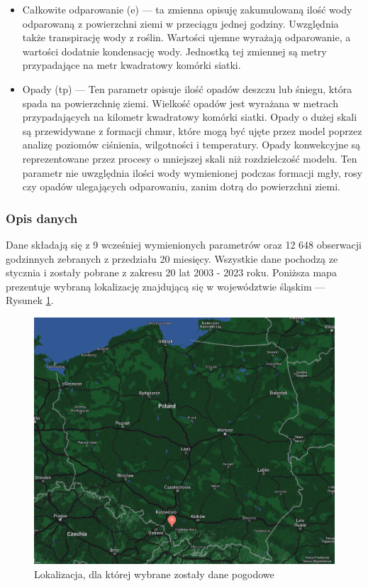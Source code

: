 \begin{itemize}
    \item Całkowite odparowanie (e) — ta zmienna opisuję zakumulowaną ilość wody odparowaną z powierzchni
    ziemi w przeciągu jednej godziny. Uwzględnia także transpirację wody z roślin. Wartości ujemne
    wyrażają odparowanie, a wartości dodatnie kondensację wody. Jednostką tej zmiennej są metry
    przypadające na metr kwadratowy komórki siatki.

    \item Opady (tp) — Ten parametr opisuje ilość opadów deszczu lub śniegu, która spada na powierzchnię ziemi.
    Wielkość opadów jest wyrażana w metrach przypadających na kilometr kwadratowy komórki siatki.
    Opady o dużej skali są przewidywane z formacji chmur, które mogą być ujęte przez model poprzez 
    analizę poziomów ciśnienia, wilgotności i temperatury. 
    Opady konwekcyjne są reprezentowane przez procesy
    o mniejszej skali niż rozdzielczość modelu. Ten parametr nie uwzględnia ilości wody wymienionej
    podczas formacji mgły, rosy czy opadów ulegających odparowaniu, zanim dotrą do powierzchni ziemi.

\end{itemize}

\subsubsection*{Opis danych}

Dane składają się z 9 wcześniej wymienionych parametrów oraz 12 648 obserwacji godzinnych zebranych
z przedziału 20 miesięcy. Wszystkie dane pochodzą ze stycznia i zostały pobrane z zakresu 20 lat
2003 - 2023 roku. Poniższa mapa prezentuje wybraną lokalizację znajdującą się w województwie śląskim — Rysunek \ref{map}.

\begin{figure}[H]
    \centering
    \includegraphics[width=\textwidth]{images/map.png}
    \caption{Lokalizacja, dla której wybrane zostały dane pogodowe}
    \label{map}
\end{figure}

